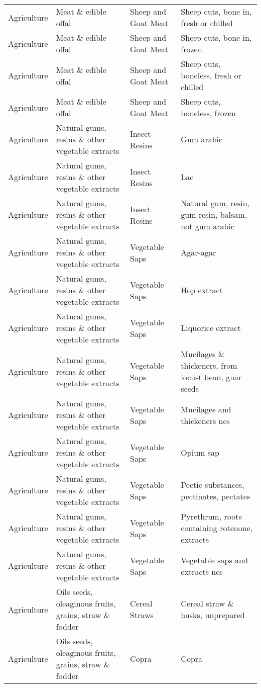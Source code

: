 \begin{appendices}
\begin{xltabular}{\textwidth}{|p{0.07\textwidth}|p{0.28\textwidth}|p{0.24\textwidth}|p{0.31\textwidth}|}
	Agriculture & Meat \& edible offal & Sheep and Goat Meat & Sheep cuts, bone in, fresh or chilled \\
	Agriculture & Meat \& edible offal & Sheep and Goat Meat & Sheep cuts, bone in, frozen \\
	Agriculture & Meat \& edible offal & Sheep and Goat Meat & Sheep cuts, boneless, fresh or chilled \\
	Agriculture & Meat \& edible offal & Sheep and Goat Meat & Sheep cuts, boneless, frozen \\
	Agriculture & Natural gums, resins \& other vegetable extracts & Insect Resins & Gum arabic \\
	Agriculture & Natural gums, resins \& other vegetable extracts & Insect Resins & Lac \\
	Agriculture & Natural gums, resins \& other vegetable extracts & Insect Resins & Natural gum, resin, gum-resin, balsam, not gum arabic \\
	Agriculture & Natural gums, resins \& other vegetable extracts & Vegetable Saps & Agar-agar \\
	Agriculture & Natural gums, resins \& other vegetable extracts & Vegetable Saps & Hop extract \\
	Agriculture & Natural gums, resins \& other vegetable extracts & Vegetable Saps & Liquorice extract \\
	Agriculture & Natural gums, resins \& other vegetable extracts & Vegetable Saps & Mucilages \& thickeners, from locust bean, guar seeds \\
	Agriculture & Natural gums, resins \& other vegetable extracts & Vegetable Saps & Mucilages and thickeners nes \\
	Agriculture & Natural gums, resins \& other vegetable extracts & Vegetable Saps & Opium sap \\
	Agriculture & Natural gums, resins \& other vegetable extracts & Vegetable Saps & Pectic substances, pectinates, pectates \\
	Agriculture & Natural gums, resins \& other vegetable extracts & Vegetable Saps & Pyrethrum, roots containing rotenone, extracts \\
	Agriculture & Natural gums, resins \& other vegetable extracts & Vegetable Saps & Vegetable saps and extracts nes \\
	Agriculture & Oils seeds, oleaginous fruits, grains, straw \& fodder & Cereal Straws & Cereal straw \& husks, unprepared \\
	Agriculture & Oils seeds, oleaginous fruits, grains, straw \& fodder & Copra & Copra \\

\end{xltabular}
\end{appendices}
